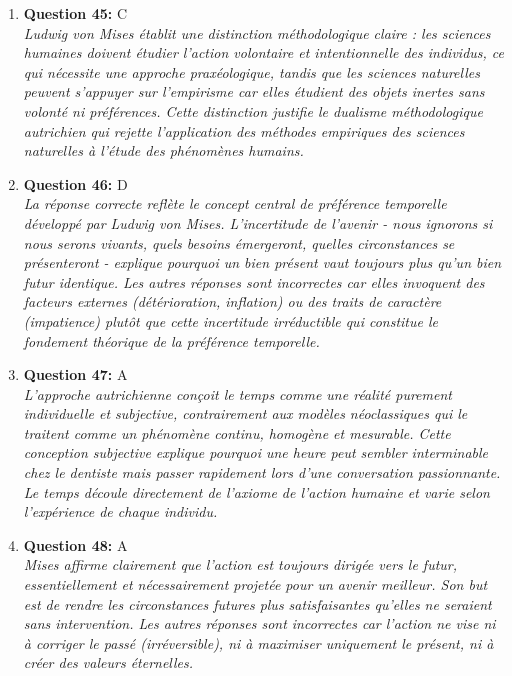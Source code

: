 \documentclass[12pt,a4paper]{article}
\begin{document}
\begin{enumerate}
\item \textbf{Question 45:} C
\\ \textit{Ludwig von Mises établit une distinction méthodologique claire : les sciences humaines doivent étudier l'action volontaire et intentionnelle des individus, ce qui nécessite une approche praxéologique, tandis que les sciences naturelles peuvent s'appuyer sur l'empirisme car elles étudient des objets inertes sans volonté ni préférences. Cette distinction justifie le dualisme méthodologique autrichien qui rejette l'application des méthodes empiriques des sciences naturelles à l'étude des phénomènes humains.}

\item \textbf{Question 46:} D
\\ \textit{La réponse correcte reflète le concept central de préférence temporelle développé par Ludwig von Mises. L'incertitude de l'avenir - nous ignorons si nous serons vivants, quels besoins émergeront, quelles circonstances se présenteront - explique pourquoi un bien présent vaut toujours plus qu'un bien futur identique. Les autres réponses sont incorrectes car elles invoquent des facteurs externes (détérioration, inflation) ou des traits de caractère (impatience) plutôt que cette incertitude irréductible qui constitue le fondement théorique de la préférence temporelle.}

\item \textbf{Question 47:} A
\\ \textit{L'approche autrichienne conçoit le temps comme une réalité purement individuelle et subjective, contrairement aux modèles néoclassiques qui le traitent comme un phénomène continu, homogène et mesurable. Cette conception subjective explique pourquoi une heure peut sembler interminable chez le dentiste mais passer rapidement lors d'une conversation passionnante. Le temps découle directement de l'axiome de l'action humaine et varie selon l'expérience de chaque individu.}

\item \textbf{Question 48:} A
\\ \textit{Mises affirme clairement que l'action est toujours dirigée vers le futur, essentiellement et nécessairement projetée pour un avenir meilleur. Son but est de rendre les circonstances futures plus satisfaisantes qu'elles ne seraient sans intervention. Les autres réponses sont incorrectes car l'action ne vise ni à corriger le passé (irréversible), ni à maximiser uniquement le présent, ni à créer des valeurs éternelles.}


\end{enumerate}
\end{document}
